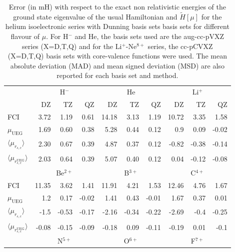 \documentclass[aip,jcp,reprint,noshowkeys,superscriptaddress]{revtex4-1}
\newcommand{\muueg}{\mu_{\text{UEG}}}
\newcommand{\murscav}{\langle \mu_{r_{s,c}}\rangle}
\newcommand{\mursclda}{\langle \mu_{r_{s,c}^{\text{UEG}}}\rangle}
\begin{document}
\begin{table}
\label{table_conv_e_mu_iso}
\caption{Error (in mH) with respect to the exact non relativistic energies of the ground state eigenvalue of the usual Hamiltonian and $\tilde{H}[\mu]$ for the helium isoelectronic series with Dunning basis sets basis sets for different flavour of $\mu$. For H$^{-}$ and He, the basis sets used are the aug-cc-pVXZ series (X=D,T,Q) and for the Li$^+$-Ne$^{8+}$ series, the cc-pCVXZ (X=D,T,Q) basis sets with core-valence functions were used. The mean absolute deviation (MAD) and mean signed deviation (MSD) are also reported for each basis set and method. }
\begin{ruledtabular}
\begin{tabular}{l|rrr||rrr||rrr|}
             &\multicolumn{3}{c}{H$^-$}      & \multicolumn{3}{c}{He}       & \multicolumn{3}{c}{Li$^+$}    \\
             &   DZ    &  TZ      &   QZ     &  DZ     &   TZ     &  QZ     &   DZ    &   TZ     &  QZ      \\                   
\hline
 FCI         &   3.72  &    1.19  &   0.61   &  14.18  &   3.13   &  1.19   &  10.72  &   3.35   &  1.58    \\      
$\muueg$     &   1.69  &    0.60  &   0.38   &  5.28   &   0.44   &  0.12   &  0.9    &   0.09   & -0.02    \\      
$\murscav$   &   2.30  &    0.67  &   0.39   &  4.87   &   0.37   &  0.12   &  -0.82  &  -0.38   & -0.14    \\      
$\mursclda$  &   2.03  &    0.64  &   0.39   &  5.07   &   0.40   &  0.12   &  0.04   &  -0.12   & -0.08    \\      
\hline
             &\multicolumn{3}{c}{Be$^{2+}$}  & \multicolumn{3}{c}{B$^{3+}$} & \multicolumn{3}{c}{C$^{4+}$}    \\
 FCI         &  11.35  &   3.62   &  1.41    &  11.91  &   4.21   &  1.53   &  12.46  &   4.76   &  1.67    \\  
$\muueg$     &  1.2    &   0.17   & -0.02    &  1.41   &   0.43   &  -0.01  &  1.67   &   0.37   &  0.01    \\  
$\murscav$   &  -1.5   &  -0.53   & -0.17    &  -2.16  &  -0.34   &  -0.22  &  -2.69  &  -0.4    & -0.25    \\  
$\mursclda$  &  -0.08  &  -0.15   & -0.09    &  -0.18  &   0.09   &  -0.11  &  -0.19  &   0.01   &  -0.1    \\  
\hline
             &\multicolumn{3}{c}{N$^{5+}$}   & \multicolumn{3}{c}{O$^{6+}$} & \multicolumn{3}{c}{F$^{7+}$}    \\

\end{tabular}
\end{ruledtabular}
\end{table}
\end{document}
